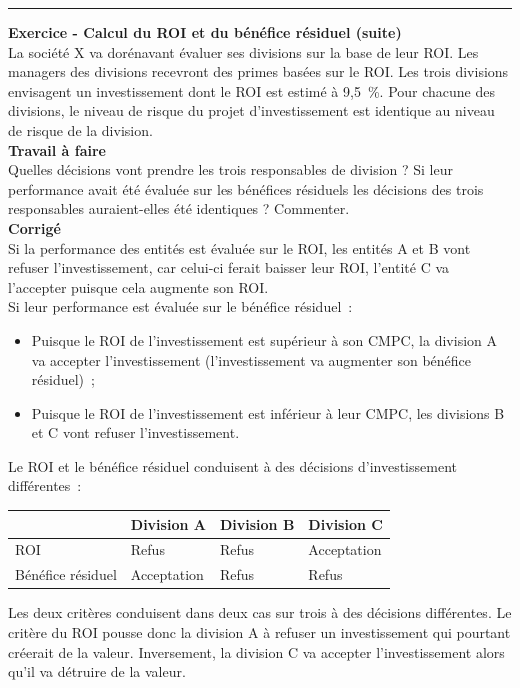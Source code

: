 \documentclass{tufte-handout}
\begin{document}
\begin{enumerate}
\noindent\rule{\textwidth}{0.5pt}
\textbf{Exercice - Calcul du ROI et du bénéfice résiduel (suite)}\\
La société X va dorénavant évaluer ses divisions sur la base de leur ROI. Les managers des divisions recevront des primes basées sur le ROI. Les trois divisions envisagent un investissement dont le ROI est estimé à 9,5 \%. Pour chacune des divisions, le niveau de risque du projet d'investissement est identique au niveau de risque de la division.\\
\textbf{Travail à faire}\\
Quelles décisions vont prendre les trois responsables de division ? Si leur performance avait été évaluée sur les bénéfices résiduels les décisions des trois responsables auraient-elles été identiques ? Commenter.\\
\textbf{Corrigé}\\
Si la performance des entités est évaluée sur le ROI, les entités A et B vont refuser l'investissement, car celui-ci ferait baisser leur ROI, l'entité C va l'accepter puisque cela augmente son ROI.\\
Si leur performance est évaluée sur le bénéfice résiduel :\\
\begin{itemize}
\item Puisque le ROI de l'investissement est supérieur à son CMPC, la division A va accepter l'investissement (l'investissement va augmenter son bénéfice résiduel) ;\\
\item Puisque le ROI de l'investissement est inférieur à leur CMPC, les divisions B et C vont refuser l'investissement.\\
\end{itemize}
Le ROI et le bénéfice résiduel conduisent à des décisions d'investissement différentes :\\
\begin{center}
\begin{tabular}{llll}
 & Division A & Division B & Division C\\
\hline
ROI & Refus & Refus & Acceptation\\
Bénéfice résiduel & Acceptation & Refus & Refus\\
\end{tabular}
\end{center}
Les deux critères conduisent dans deux cas sur trois à des décisions différentes. Le critère du ROI pousse donc la division A à refuser un investissement qui pourtant créerait de la valeur. Inversement, la division C va accepter l'investissement alors qu'il va détruire de la valeur.\\


\end{enumerate}
\end{document}
